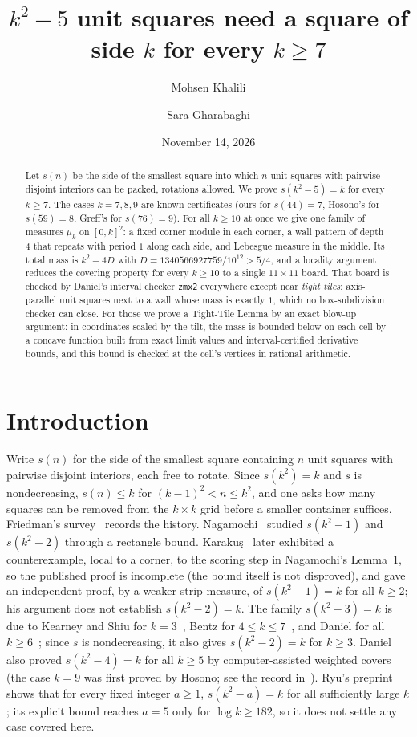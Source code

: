 \documentclass[11pt]{amsart}
\title{$k^2-5$ unit squares need a square of side $k$ for every $k\ge7$}
\author{Mohsen Khalili}
\author{Sara Gharabaghi}
\date{November 14, 2026}
\theoremstyle{definition}
\theoremstyle{remark}
\begin{document}
\begin{abstract}
Let $s(n)$ be the side of the smallest square into which $n$ unit squares with pairwise disjoint interiors can be
packed, rotations allowed. We prove $s(k^2-5)=k$ for every $k\ge7$. The cases $k=7,8,9$ are known
certificates (ours for $s(44)=7$, Hosono's for $s(59)=8$, Greff's for $s(76)=9$). For all $k\ge10$ at once we give
one family of measures $\mu_k$ on $[0,k]^2$: a fixed corner module in each corner, a wall pattern of depth $4$ that
repeats with period $1$ along each side, and Lebesgue measure in the middle. Its total mass is $k^2-4D$ with
$D=1340566927759/10^{12}>5/4$, and a locality argument reduces the covering property for every $k\ge10$ to a single
$11\times11$ board. That board is checked by Daniel's interval checker \texttt{zmx2} everywhere except near
\emph{tight tiles}: axis-parallel unit squares next to a wall whose mass is exactly $1$, which no box-subdivision
checker can close. For those we prove a Tight-Tile Lemma by an exact blow-up argument: in coordinates scaled by the
tilt, the mass is bounded below on each cell by a concave function built from exact limit values and
interval-certified derivative bounds, and this bound is checked at the cell's vertices in rational arithmetic.
\end{abstract}
\maketitle

\section{Introduction}

Write $s(n)$ for the side of the smallest square containing $n$ unit squares with pairwise disjoint interiors,
each free to rotate. Since $s(k^2)=k$ and $s$ is nondecreasing, $s(n)\le k$ for $(k-1)^2<n\le k^2$, and one asks how
many squares can be removed from the $k\times k$ grid before a smaller container suffices. Friedman's
survey~\cite{friedman} records the history. Nagamochi~\cite{nagamochi} studied $s(k^2-1)$ and $s(k^2-2)$ through a rectangle bound.
Karaku\c{s}~\cite{karakus} later exhibited a counterexample, local to a corner, to the scoring step in Nagamochi's
Lemma~1, so the published proof is incomplete (the bound itself is not disproved), and gave an independent proof,
by a weaker strip measure, of $s(k^2-1)=k$ for all $k\ge2$; his argument does not establish $s(k^2-2)=k$. The family $s(k^2-3)=k$ is due to Kearney and Shiu for $k=3$~\cite{kearney}, Bentz for
$4\le k\le7$~\cite{bentz,bentz2}, and Daniel for all $k\ge6$~\cite{daniel}; since $s$ is nondecreasing, it also gives
$s(k^2-2)=k$ for $k\ge3$. Daniel also proved $s(k^2-4)=k$ for all $k\ge5$ by computer-assisted weighted covers (the
case $k=9$ was first proved by Hosono; see the record in~\cite{daniel}). Ryu's preprint~\cite{ryu} shows that for
every fixed integer $a\ge1$, $s(k^2-a)=k$ for all sufficiently large $k$; its explicit bound reaches $a=5$ only for
$\log k\ge182$, so it does not settle any case covered here.
\end{document}
